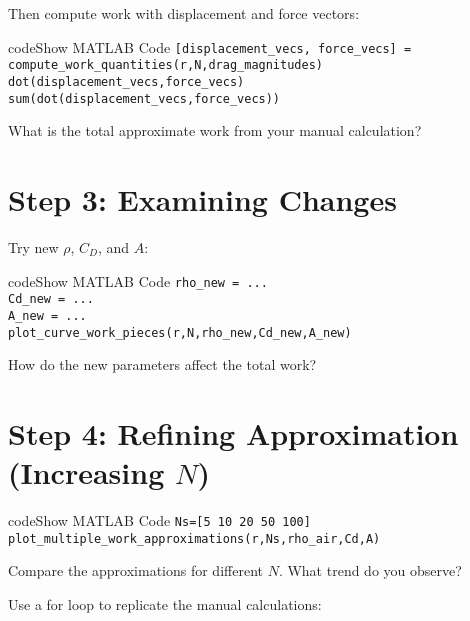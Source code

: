 \documentclass{ximera}
\begin{document}
Then compute work with displacement and force vectors:

\begin{expandable}{code}{Show MATLAB Code}
\texttt{[displacement\_vecs, force\_vecs] = compute\_work\_quantities(r,N,drag\_magnitudes)}\\
\texttt{dot(displacement\_vecs,force\_vecs)}\\
\texttt{sum(dot(displacement\_vecs,force\_vecs))}
\end{expandable}

\begin{problem}
What is the total approximate work from your manual calculation?
\end{problem}

\section*{Step 3: Examining Changes}

Try new $\rho$, $C_D$, and $A$:

\begin{expandable}{code}{Show MATLAB Code}
\texttt{rho\_new = ...}\\
\texttt{Cd\_new = ...}\\
\texttt{A\_new = ...}\\
\texttt{plot\_curve\_work\_pieces(r,N,rho\_new,Cd\_new,A\_new)}
\end{expandable}

\begin{problem}
How do the new parameters affect the total work?
\end{problem}

\section*{Step 4: Refining Approximation (Increasing $N$)}

\begin{expandable}{code}{Show MATLAB Code}
\texttt{Ns=[5 10 20 50 100]}\\
\texttt{plot\_multiple\_work\_approximations(r,Ns,rho\_air,Cd,A)}
\end{expandable}

\begin{problem}
Compare the approximations for different $N$. What trend do you observe?
\end{problem}

Use a for loop to replicate the manual calculations:
\end{document}
